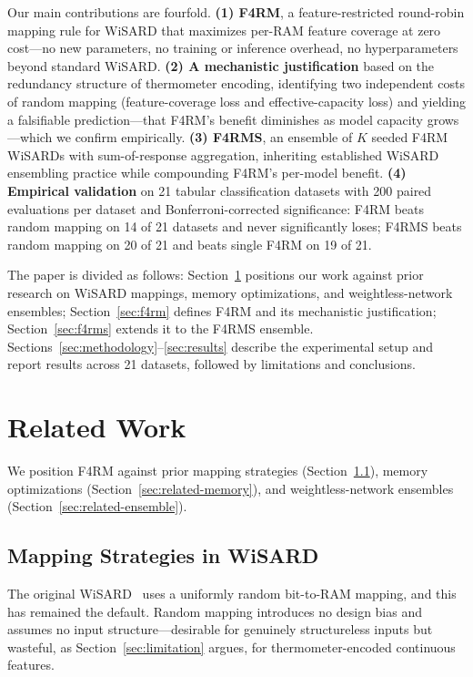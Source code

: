 \documentclass[runningheads]{llncs}
\begin{document}
Our main contributions are fourfold. \textbf{(1) F4RM}, a feature-restricted round-robin mapping rule for WiSARD that maximizes per-RAM feature coverage at zero cost---no new parameters, no training or inference overhead, no hyperparameters beyond standard WiSARD. \textbf{(2) A mechanistic justification} based on the redundancy structure of thermometer encoding, identifying two independent costs of random mapping (feature-coverage loss and effective-capacity loss) and yielding a falsifiable prediction---that F4RM's benefit diminishes as model capacity grows---which we confirm empirically. \textbf{(3) F4RMS}, an ensemble of $K$ seeded F4RM WiSARDs with sum-of-response aggregation, inheriting established WiSARD ensembling practice while compounding F4RM's per-model benefit. \textbf{(4) Empirical validation} on 21 tabular classification datasets with 200 paired evaluations per dataset and Bonferroni-corrected significance: F4RM beats random mapping on 14 of 21 datasets and never significantly loses; F4RMS beats random mapping on 20 of 21 and beats single F4RM on 19 of 21.

The paper is divided as follows: Section~\ref{sec:related} positions our work against prior research on WiSARD mappings, memory optimizations, and weightless-network ensembles; Section~\ref{sec:f4rm} defines F4RM and its mechanistic justification; Section~\ref{sec:f4rms} extends it to the F4RMS ensemble. Sections~\ref{sec:methodology}--\ref{sec:results} describe the experimental setup and report results across 21 datasets, followed by limitations and conclusions.


\section{Related Work}
\label{sec:related}

We position F4RM against prior mapping strategies (Section~\ref{sec:related-mapping}), memory optimizations (Section~\ref{sec:related-memory}), and weightless-network ensembles (Section~\ref{sec:related-ensemble}).

\subsection{Mapping Strategies in WiSARD}
\label{sec:related-mapping}

The original WiSARD~\cite{aleksander1984wisard} uses a uniformly random bit-to-RAM mapping, and this has remained the default. Random mapping introduces no design bias and assumes no input structure---desirable for genuinely structureless inputs but wasteful, as Section~\ref{sec:limitation} argues, for thermometer-encoded continuous features.
\end{document}
